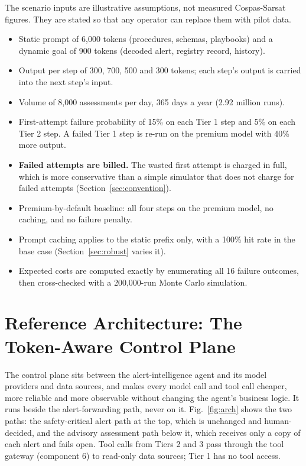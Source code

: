 \documentclass[conference]{IEEEtran}
\begin{document}
The scenario inputs are illustrative assumptions, not measured Cospas-Sarsat figures. They are stated so that any operator can replace them with pilot data.
\begin{itemize}
\item Static prompt of 6,000 tokens (procedures, schemas, playbooks) and a dynamic goal of 900 tokens (decoded alert, registry record, history).
\item Output per step of 300, 700, 500 and 300 tokens; each step's output is carried into the next step's input.
\item Volume of 8,000 assessments per day, 365 days a year (2.92 million runs).
\item First-attempt failure probability of 15\% on each Tier 1 step and 5\% on each Tier 2 step. A failed Tier 1 step is re-run on the premium model with 40\% more output.
\item \textbf{Failed attempts are billed.} The wasted first attempt is charged in full, which is more conservative than a simple simulator that does not charge for failed attempts (Section~\ref{sec:convention}).
\item Premium-by-default baseline: all four steps on the premium model, no caching, and no failure penalty.
\item Prompt caching applies to the static prefix only, with a 100\% hit rate in the base case (Section~\ref{sec:robust} varies it).
\item Expected costs are computed exactly by enumerating all 16 failure outcomes, then cross-checked with a 200,000-run Monte Carlo simulation.
\end{itemize}

\section{Reference Architecture: The Token-Aware Control Plane}
\label{sec:arch}

The control plane sits between the alert-intelligence agent and its model providers and data sources, and makes every model call and tool call cheaper, more reliable and more observable without changing the agent's business logic. It runs beside the alert-forwarding path, never on it. Fig.~\ref{fig:arch} shows the two paths: the safety-critical alert path at the top, which is unchanged and human-decided, and the advisory assessment path below it, which receives only a copy of each alert and fails open. Tool calls from Tiers 2 and 3 pass through the tool gateway (component 6) to read-only data sources; Tier 1 has no tool access.
\end{document}
